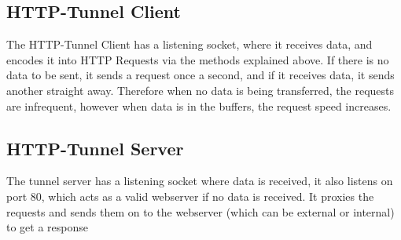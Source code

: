 \documentclass[12pt]{article}
\begin{document}
\subsection{HTTP-Tunnel Client}
The HTTP-Tunnel Client has a listening socket, where it receives data, and encodes it into HTTP Requests via the methods explained above.
If there is no data to be sent, it sends a request once a second, and if it receives data, it sends another straight away.
Therefore when no data is being transferred, the requests are infrequent, however when data is in the buffers, the request speed increases.

\subsection{HTTP-Tunnel Server}
The tunnel server has a listening socket where data is received, it also listens on port 80, which acts as a valid webserver if no data is received. It proxies the requests and sends them on to the webserver (which can be external or internal) to get a response
\end{document}
